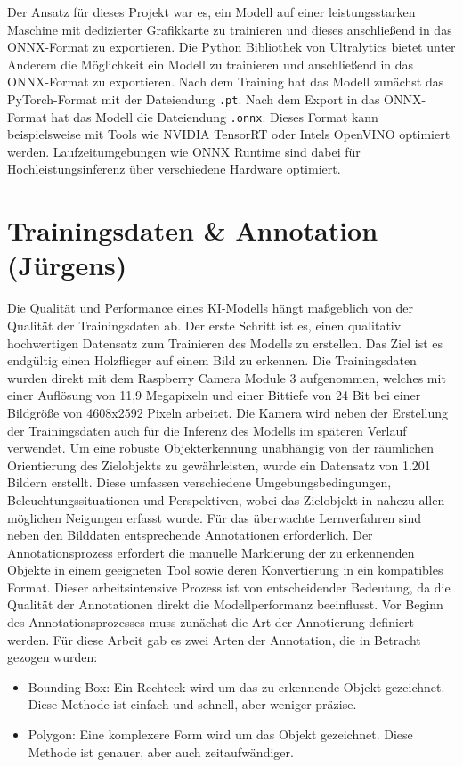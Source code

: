 Der Ansatz für dieses Projekt war es, ein Modell auf einer leistungsstarken Maschine mit dedizierter Grafikkarte zu trainieren und dieses anschließend in das ONNX-Format zu exportieren. Die Python Bibliothek von Ultralytics bietet unter Anderem die Möglichkeit ein Modell zu trainieren und anschließend in das ONNX-Format zu exportieren. Nach dem Training hat das Modell zunächst das PyTorch-Format mit der Dateiendung \texttt{.pt}.
Nach dem Export in das ONNX-Format hat das Modell die Dateiendung \texttt{.onnx}. Dieses Format kann beispielsweise mit Tools wie NVIDIA TensorRT oder Intels OpenVINO optimiert werden. Laufzeitumgebungen wie ONNX Runtime sind dabei für Hochleistungsinferenz über verschiedene Hardware optimiert. \cite{ultralyticsGlossaryONNX}


\section{Trainingsdaten \& Annotation (Jürgens)}
Die Qualität und Performance eines KI-Modells hängt maßgeblich von der Qualität der Trainingsdaten ab. Der erste Schritt ist es, einen qualitativ hochwertigen Datensatz zum Trainieren des Modells zu erstellen. Das Ziel ist es endgültig einen Holzflieger auf einem Bild zu erkennen. Die Trainingsdaten wurden direkt mit dem Raspberry Camera Module 3 aufgenommen, welches mit einer Auflösung von 11,9 Megapixeln und einer Bittiefe von 24 Bit bei einer Bildgröße von 4608x2592 Pixeln arbeitet. \cite{raspberrypi5cammodule3} Die Kamera wird neben der Erstellung der Trainingsdaten auch für die Inferenz des Modells im späteren Verlauf verwendet. 
Um eine robuste Objekterkennung unabhängig von der räumlichen Orientierung des Zielobjekts zu gewährleisten, wurde ein Datensatz von 1.201 Bildern erstellt. Diese umfassen verschiedene Umgebungsbedingungen, Beleuchtungssituationen und Perspektiven, wobei das Zielobjekt in nahezu allen möglichen Neigungen erfasst wurde.
Für das überwachte Lernverfahren sind neben den Bilddaten entsprechende Annotationen erforderlich. Der Annotationsprozess erfordert die manuelle Markierung der zu erkennenden Objekte in einem geeigneten Tool sowie deren Konvertierung in ein kompatibles Format. Dieser arbeitsintensive Prozess ist von entscheidender Bedeutung, da die Qualität der Annotationen direkt die Modellperformanz beeinflusst. Vor Beginn des Annotationsprozesses muss zunächst die Art der Annotierung definiert werden.
Für diese Arbeit gab es zwei Arten der Annotation, die in Betracht gezogen wurden:
\begin{itemize}
    \item Bounding Box: Ein Rechteck wird um das zu erkennende Objekt gezeichnet. Diese Methode ist einfach und schnell, aber weniger präzise.
    \item Polygon: Eine komplexere Form wird um das Objekt gezeichnet. Diese Methode ist genauer, aber auch zeitaufwändiger.
\end{itemize}
